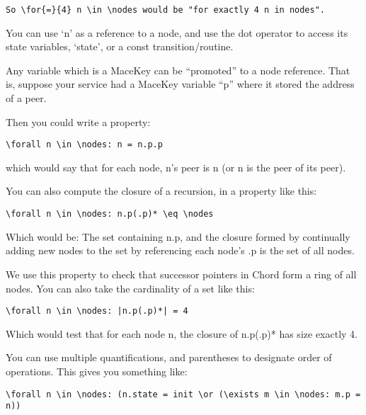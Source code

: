 \documentclass[12pt,letterpaper]{article}
\newenvironment{code}
{\begin{list}{}{\setlength{\leftmargin}{1em}}\item\scriptsize\bfseries}
{\end{list}}
\begin{document}
\begin{code}
\begin{verbatim}
So \for{=}{4} n \in \nodes would be "for exactly 4 n in nodes".
\end{verbatim}
\end{code}

You can use `n' as a reference to a node, and use the dot operator to access its state variables, `state', or a const transition/routine.  

Any variable which is a MaceKey can be ``promoted'' to a node reference.
That is, suppose your service had a MaceKey variable ``p'' where it stored the address of a peer.

Then you could write a property:

\begin{code}
\begin{verbatim}
\forall n \in \nodes: n = n.p.p
\end{verbatim}
\end{code}

which would say that for each node, n's peer is n (or n is the peer of its peer).  

You can also compute the closure of a recursion, in a property like
this:

\begin{code}
\begin{verbatim}
\forall n \in \nodes: n.p(.p)* \eq \nodes
\end{verbatim}
\end{code}

Which would be:
The set containing n.p, and the closure formed by continually adding new nodes to the set by referencing each node's .p is the set of all nodes.

We use this property to check that successor pointers in Chord form a ring of all nodes.  You can also take the cardinality of a set like
this:


\begin{code}
\begin{verbatim}
\forall n \in \nodes: |n.p(.p)*| = 4
\end{verbatim}
\end{code}

Which would test that for each node n, the closure of n.p(.p)* has size exactly 4.

You can use multiple quantifications, and parentheses to designate order of operations.  This gives you something like:

\begin{code}
\begin{verbatim}
\forall n \in \nodes: (n.state = init \or (\exists m \in \nodes: m.p = n))
\end{verbatim}
\end{code}
\end{document}
